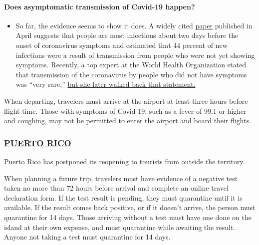 \begin{itemize}
{  \paragraph{Does asymptomatic transmission of Covid-19
  happen?}\label{does-asymptomatic-transmission-of-covid-19-happen}}

  \begin{itemize}
  \tightlist
  \item
    So far, the evidence seems to show it does. A widely cited
    \href{https://www.nature.com/articles/s41591-020-0869-5}{paper}
    published in April suggests that people are most infectious about
    two days before the onset of coronavirus symptoms and estimated that
    44 percent of new infections were a result of transmission from
    people who were not yet showing symptoms. Recently, a top expert at
    the World Health Organization stated that transmission of the
    coronavirus by people who did not have symptoms was ``very rare,''
    \href{https://www.nytimes.com/2020/06/09/world/coronavirus-updates.html?action=click\&pgtype=Article\&state=default\&region=MAIN_CONTENT_3\&context=storylines_faq\#link-1f302e21}{but
    she later walked back that statement.}
  \end{itemize}
\end{itemize}

When departing, travelers must arrive at the airport at least three
hours before flight time. Those with symptoms of Covid-19, such as a
fever of 99.1 or higher and coughing, may not be permitted to enter the
airport and board their flights.

\hypertarget{puerto-rico}{%
\subsubsection{\texorpdfstring{\href{https://www.discoverpuertorico.com/info/travel-advisory}{PUERTO
RICO}}{PUERTO RICO}}\label{puerto-rico}}

Puerto Rico has postponed its reopening to tourists from outside the
territory.

When planning a future trip, travelers must have evidence of a negative
test taken no more than 72 hours before arrival and complete an online
travel declaration form. If the test result is pending, they must
quarantine until it is available. If the result comes back positive, or
if it doesn't arrive, the person must quarantine for 14 days. Those
arriving without a test must have one done on the island at their own
expense, and must quarantine while awaiting the result. Anyone not
taking a test must quarantine for 14 days.

